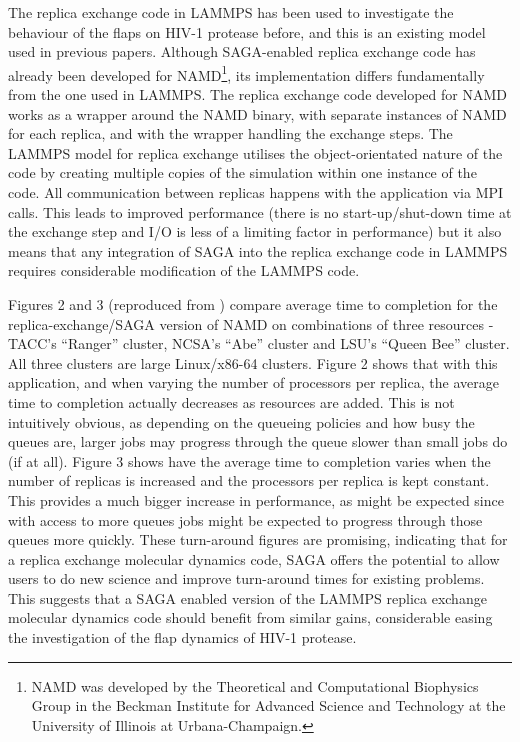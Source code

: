 \documentclass[a4paper,10pt,twocolumn]{article}
\newcommand{\jhanote}[1]{ {\textcolor{red} { ***Jha: #1 }}}
\newcommand{\jhanote}[1]{}
\begin{document}



The replica exchange code in LAMMPS\cite{ref:lammps,ref:lammps2} has been used to investigate the behaviour of the flaps on HIV-1 protease before, and this is an existing model used in previous papers.
Although SAGA-enabled replica exchange code has already been developed\cite{ref:saganamd,ref:saganamd2} for NAMD\cite{ref:namd}\footnote{NAMD was developed by the Theoretical and Computational Biophysics Group in the Beckman Institute for Advanced Science and Technology at the University of Illinois at Urbana-Champaign.}, its implementation differs fundamentally from the one used in LAMMPS.  The replica exchange code developed for NAMD works as a wrapper around the NAMD binary, with separate instances of NAMD for each replica, and with the wrapper handling the exchange steps.  The LAMMPS model for replica exchange utilises the object-orientated nature of the code by creating multiple copies of the simulation within one instance of the code.  All communication between replicas happens with the application via MPI calls.  This leads to improved performance (there is no start-up/shut-down time at the exchange step and I/O is less of a limiting factor in performance) but it also means that any integration of SAGA into the replica exchange code in LAMMPS requires considerable modification of the LAMMPS code.

Figures 2 and 3 (reproduced from \cite{ref:saganamd}) compare average time to completion for the replica-exchange/SAGA version of NAMD on combinations of three resources - TACC's ``Ranger'' cluster, NCSA's ``Abe'' cluster and LSU's ``Queen Bee'' cluster.  All three clusters are large Linux/x86-64 clusters.  Figure 2 shows that with this application, and when varying the number of processors per replica, the average time to completion actually decreases as resources are added.  This is not intuitively obvious, as depending on the queueing policies and how busy the queues are, larger jobs may progress through the queue slower than small jobs do (if at all).  Figure 3 shows have the average time to completion varies when the number of replicas is increased and the processors per replica is kept constant.  This provides a much bigger increase in performance, as might be expected since with access to more queues jobs might be expected to progress through those queues more quickly.  These turn-around figures are promising, indicating that for a replica exchange molecular dynamics code, SAGA offers the potential to allow users to do new science and improve turn-around times for existing problems.  This suggests that a SAGA enabled version of the LAMMPS replica exchange molecular dynamics code should benefit from similar gains, considerable easing the investigation of the flap dynamics of HIV-1 protease.
\end{document}
